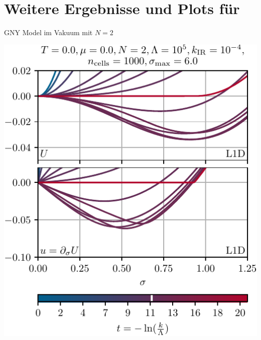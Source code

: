 \section{Weitere Ergebnisse und Plots für  }

\begin{frame}{GNY Model im Vakuum mit $N=2$}
	\label{2dvac}
	\centering

	\includegraphics[width=0.47\framewidth]{../gn/figures/flow_L1D_N=2,T=0.0,mu=0.0.pdf}\hspace{.5cm}

\end{frame}

